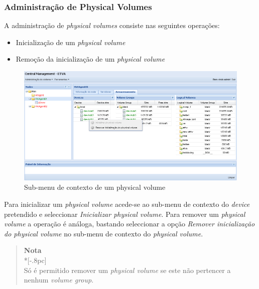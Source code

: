 
\subsubsection{Administração de Physical Volumes}
A administração de \emph{physical volumes} consiste nas seguintes operações:
\begin{itemize}
	\item Inicialização de um \emph{physical volume}
        \item Remoção da inicialização de um \emph{physical volume}
\end{itemize}

\begin{figure}[H]
        \begin{center}
        \includegraphics[scale=0.45]{screenshots/node_storage_device_ctx.png}
        \caption{Sub-menu de contexto de um physical volume}
        \label{fig:storage_device_ctx}
        \end{center}
\end{figure}


Para inicializar um \emph{physical volume} acede-se ao sub-menu de contexto do \emph{device} pretendido e seleccionar \emph{Inicializar physical volume}. Para remover um \emph{physical volume} a operação é análoga, bastando seleccionar a opção \emph{Remover inicialização do physical volume} no sub-menu de contexto do \emph{physical volume}.

\begin{quote}
	{\large \bf Nota} \\*[-.8pc]
	\underline{\hspace{6in}} \\
	Só é permitido remover um \emph{physical volume} se este não pertencer a nenhum \emph{volume group}.
\end{quote}

